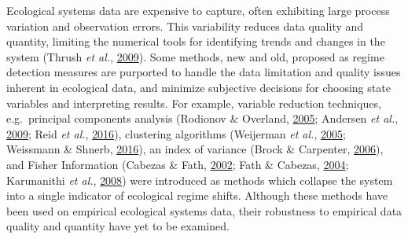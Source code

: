 \documentclass[12pt,twoside,openany]{reedthesis}
\begin{document}
Ecological systems data are expensive to capture, often exhibiting large process variation and observation errors. This variability reduces data quality and quantity, limiting the numerical tools for identifying trends and changes in the system (Thrush \emph{et al.}, \protect\hyperlink{ref-thrush2009forecasting}{2009}). Some methods, new and old, proposed as regime detection measures are purported to handle the data limitation and quality issues inherent in ecological data, and minimize subjective decisions for choosing state variables and interpreting results. For example, variable reduction techniques, e.g.~principal components analysis (Rodionov \& Overland, \protect\hyperlink{ref-rodionov_application_2005}{2005}; Andersen \emph{et al.}, \protect\hyperlink{ref-andersen_ecological_2009}{2009}; Reid \emph{et al.}, \protect\hyperlink{ref-reid_global_2016}{2016}), clustering algorithms (Weijerman \emph{et al.}, \protect\hyperlink{ref-weijerman2005regime}{2005}; Weissmann \& Shnerb, \protect\hyperlink{ref-weissmann2016predicting}{2016}), an index of variance (Brock \& Carpenter, \protect\hyperlink{ref-brock_variance_2006}{2006}), and Fisher Information (Cabezas \& Fath, \protect\hyperlink{ref-cabezas_towards_2002}{2002}; Fath \& Cabezas, \protect\hyperlink{ref-fath_exergy_2004}{2004}; Karunanithi \emph{et al.}, \protect\hyperlink{ref-karunanithi_detection_2008}{2008}) were introduced as methods which collapse the system into a single indicator of ecological regime shifts. Although these methods have been used on empirical ecological systems data, their robustness to empirical data quality and quantity have yet to be examined.
\end{document}
